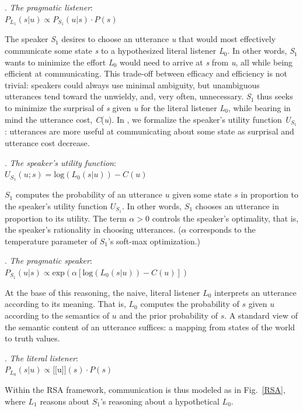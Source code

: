 \documentclass[linguex]{sp}
\newcommand{\sem}[1]{\mbox{$[\![$#1$]\!]$}}
\begin{document}
\ex. \emph{The pragmatic listener}:\\
$P_{L_{1}}(s|u) \propto P_{S_{1}}(u|s) \cdot P(s)$

The speaker \emph{S}$_{1}$ desires to choose an utterance \emph{u} that would most effectively communicate some state \emph{s} to a hypothesized literal listener \emph{L}$_{0}$.  In other words, \emph{S}$_{1}$ wants to minimize the effort \emph{L}$_{0}$ would need to arrive at \emph{s} from \emph{u}, all while being efficient at communicating. This trade-off between efficacy and efficiency is not trivial: speakers could always use minimal ambiguity, but unambiguous utterances tend toward the unwieldy, and, very often, unnecessary. \emph{S}$_{1}$ thus seeks to minimize the surprisal of \emph{s} given \emph{u} for the literal listener \emph{L}$_{0}$, while bearing in mind the utterance cost, \emph{C}(\emph{u}). In \Next, we formalize the speaker's utility function \emph{U}$_{S_{1}}$: utterances are more useful at communicating about some state as surprisal and utterance cost decrease.

\ex. \emph{The speaker's utility function}:\\
$U_{S_{1}}(u;s) = \textrm{log}(L_{0}(s|u)) - C(u)$

$S_{1}$ computes the probability of an utterance $u$ given some state $s$ in proportion to the speaker's utility function $U_{S_{1}}$. In other words, $S_{1}$ chooses an utterance in proportion to its utility. The term \mbox{$\alpha > 0$} controls the speaker's optimality, that is, the speaker's rationality in choosing utterances. ($\alpha$ corresponds to the temperature parameter of $S_{1}$'s soft-max optimization.)

\ex. \emph{The pragmatic speaker}:\\
$P_{S_{1}}(u|s) \propto \textrm{exp}(\alpha[\textrm{log}(L_{0}(s|u)) - C(u)])$

At the base of this reasoning, the naive, literal listener $L_{0}$ interprets an utterance according to its meaning. That is, $L_{0}$ computes the probability of $s$ given $u$ according to the semantics of $u$ and the prior probability of $s$. A standard view of the semantic content of an utterance suffices: a mapping from states of the world to truth values.

\ex. \emph{The literal listener}:\\
$P_{L_{0}}(s|u) \propto \sem{u}(s) \cdot P(s)$

Within the RSA framework, communication is thus modeled as in Fig.~\ref{RSA}, where $L_{1}$ reasons about $S_{1}$'s reasoning about a hypothetical $L_{0}$.
\end{document}
